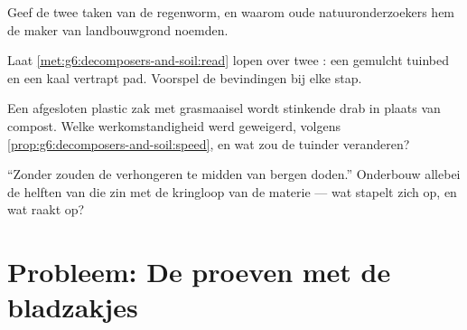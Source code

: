 \begin{exercise}[$\star\star$]\label{exo:g6:decomposers-and-soil:9}
Geef de twee taken van de regenworm, en waarom oude natuuronderzoekers
hem de maker van landbouwgrond noemden.
\end{exercise}

\begin{exercise}[$\star\star$]\label{exo:g6:decomposers-and-soil:10}
Laat \cref{met:g6:decomposers-and-soil:read} lopen over twee : een
gemulcht tuinbed en een kaal vertrapt pad. Voorspel de bevindingen bij
elke stap.
\end{exercise}

\begin{exercise}[$\star\star$]\label{exo:g6:decomposers-and-soil:11}
Een afgesloten plastic zak met grasmaaisel wordt stinkende drab in plaats
van compost. Welke werkomstandigheid werd geweigerd, volgens
\cref{prop:g6:decomposers-and-soil:speed}, en wat zou de tuinder
veranderen?
\end{exercise}

\begin{exercise}[$\star\star\star$]\label{exo:g6:decomposers-and-soil:12}
``Zonder  zouden de  verhongeren te midden van
bergen doden.'' Onderbouw allebei de helften van die zin met de kringloop
van de materie --- wat stapelt zich op, en wat raakt op?
\end{exercise}

\section{Probleem: De proeven met de bladzakjes}

